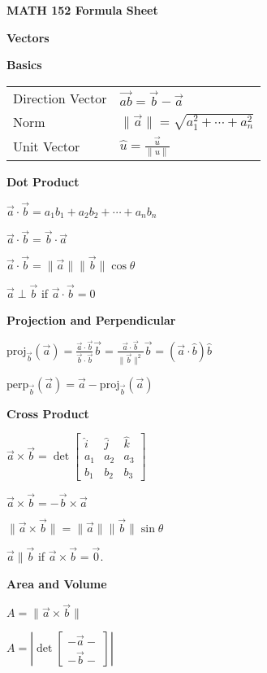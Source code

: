 \documentclass[10pt]{article}
\newcommand{\ihat}{\hat{i}}
\newcommand{\jhat}{\hat{j}}
\newcommand{\khat}{\hat{k}}
\newcommand{\proj}{\mathrm{proj}}
\newcommand\norm[1]{\lVert#1\rVert}
\newcommand\vect[1]{\overrightarrow{#1}}
\newcommand\sectionheading[1]{\begin{center}\large{\textbf{#1}}\end{center}\normalsize}
\newcommand\heading[1]{\medskip\textbf{#1}\medskip}
\begin{document}
\begin{center}
    \huge{\textbf{MATH 152 Formula Sheet}}
\end{center}

\begin{multicols*}{3}

\sectionheading{Vectors}

\heading{Basics}

\begin{tabular}{@{}ll}
    Direction Vector & $\vect{ab}=\vec b-\vec a$ \\
    Norm & $\norm{\vec a} =\sqrt{a_1^2+\cdots+a_n^2}$ \\
    Unit Vector & $\hat{u}=\frac{\vec u}{\norm{u}}$ 
\end{tabular}

\heading{Dot Product}

$\vec a \cdot \vec b = a_1 b_1 + a_2 b_2 + \cdots + a_n b_n$

$\vec a\cdot\vec b=\vec b\cdot\vec a$

$\vec a \cdot \vec b = \norm{\vec a}\norm{\vec b}\cos\theta$

$\vec a \perp \vec b$ if $\vec a \cdot\vec b = 0$ 

\heading{Projection and Perpendicular}

$\proj_{\vec b}(\vec a)=\frac{\vec a \cdot \vec b}{\vec b\cdot\vec b}\vec b=\frac{\vec a \cdot \vec b}{\norm{\vec b}^2}\vec b=(\vec a\cdot \hat{b})\hat{b}$

$\text{perp}_{\vec b}(\vec a)=\vec a-\proj_{\vec b}(\vec a)$

\heading{Cross Product}

$\vec a\times\vec b=\det\begin{bmatrix}
    \ihat & \jhat & \khat \\
    a_1 & a_2 & a_3 \\
    b_1 & b_2 & b_3
\end{bmatrix}$

$\vec a\times\vec b=-\vec b\times\vec a$

$\norm{\vec a\times\vec b}=\norm{\vec a}\norm{\vec b}\sin\theta$

$\vec a\parallel\vec b$ if $\vec a\times\vec b=\vec 0$.

\heading{Area and Volume}

$A=\norm{\vec a\times\vec b}$

$A=\left|\det\begin{bmatrix}
    -\vec a- \\
    -\vec b- 
\end{bmatrix}\right|$


\end{multicols*}
\end{document}
